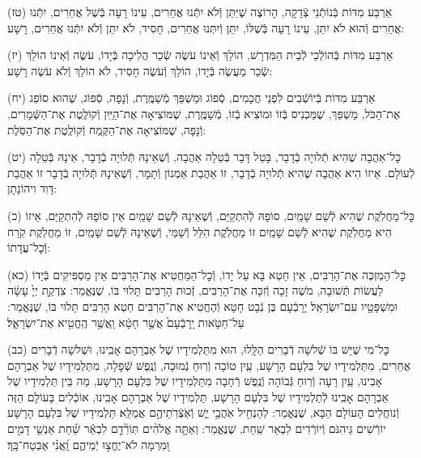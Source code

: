 \documentclass[twoside, openany, parskip=half, 11pt]{book}
\begin{document}
(טז)
אַרְבַּע מִדּוֹת בְּֿנוֹתְֿנֵי צְֿדָקָה, הָרוֹצֶה שֶׁיִּתֵּן וְֿלֹא יִתְּֿנוּ אֲחֵרִים, עֵינוֹ רָעָה בְּֿשֶׁל אֲחֵרִים, יִתְּֿנוּ אֲחֵרִים וְֿהוּא לֹא יִתֵּן, עֵינוֹ רָעָה בְּֿשֶׁלּוֹ, יִתֵּן וְֿיִתְּנוּ אֲחֵרִים, חָסִיד, לֹא יִתֵּן וְֿלֹא יִתְּֿנוּ אֲחֵרִים, רָשָׁע:

(יז)
אַרְבַּע מִדּוֹת בְּֿהוֹלְֿכֵי לְֿבֵית הַמִּדְרָשׁ, הוֹלֵךְ וְֿאֵינוֹ עֹשֶׂה שְֿׂכַר הֲלִיכָה בְּֿיָדוֹ, עֹשֶׂה וְֿאֵינוֹ הוֹלֵךְ שְֿׂכַר מַעֲשֶׂה בְּֿיָדוֹ, הוֹלֵךְ וְֿעֹשֶׂה חָסִיד, לֹא הוֹלֵךְ וְֿלֹא עֹשֶׂה רָשָׁע:

(יח)
אַרְבַּע מִדּוֹת בְּֿיוֹשְֿׁבִים לִפְנֵי חֲכָמִים, סְֿפוֹג וּמַשְׁפֵּךְ מְֿשַׁמֶּֽרֶת, וְֿנָפָה, סְֿפוֹג, שֶׁהוּא סוֹפֵג אֶת־הַכֹּל, מַשְׁפֵּךְ, שֶׁמַּכְנִיס בְּֿזוֹ וּמוֹצִיא בְֿזוֹ, מְֿשַׁמֶּֽרֶת, שֶׁמּוֹצִיאָה אֶת־הַיַּֽיִן וְֿקוֹלֶֽטֶת אֶת־הַשְּֿׁמָרִים, וְֿנָפָה, שֶׁמּוֹצִיאָה אֶת־הַקֶּֽמַח וְֿקוֹלֶֽטֶת אֶת־הַסֹּֽלֶת:

(יט)
כׇּל־אַהֲבָה שֶׁהִיא תְֿלוּיָה בְֿדָבָר, בָּטֵל דָּבָר בְּֿטֵלָה אַהֲבָה, וְֿשֶׁאֵינָהּ תְּֿלוּיָה בְֿדָבָר, אֵינָהּ בְּֿטֵלָה לְֿעוֹלָם. אֵיזוֹ הִיא אַהֲבָה שֶׁהִיא תְֿלוּיָה בְֿדָבָר, זוֹ אַהֲבַת אַמְנוֹן וְֿתָמָר, וְֿשֶׁאֵינָהּ תְּֿלוּיָה בְֿדָבָר זוֹ אַהֲבַת דָּוִד וִיהוֹנָתָן:


(כ)
כׇּל־מַחֲלֹֽקֶת שֶׁהִיא לְֿשֵׁם שָׁמַֽיִם, סוֹפָהּ לְֿהִתְקַיַּם, וְֿשֶׁאֵינָהּ לְֿשֵׁם שָׁמַֽיִם אֵין סוֹפָהּ לְֿהִתְקַיַּם, אֵיזוֹ הִיא מַחֲלֹֽקֶת שֶׁהִיא לְֿשֵׁם שָׁמַֽיִם זוֹ מַחֲלֹֽקֶת הִלֵּל וְֿשַׁמַּי, וְֿשֶׁאֵינָהּ לְֿשֵׁם שָׁמַֽיִם, זוֹ מַחֲלֹֽקֶת קֹֽרַח וְֿכׇל־עֲדָתוֹ:

(כא)
כׇּל־הַמְזְכֶּה אֶת־הָרַבִּים, אֵין חֵטְא בָּא עַל יָדוֹ, וְֿכׇל־הַמַּחֲטִיא אֶת־הָרַבִּים אֵין מַסְפִּיקִים בְּֿיָדוֹ לַעֲשׂוֹת תְּֿשׁוּבָה, מֹשֶׁה זָכָה וְֿזִכָּה אֶת־הָרַבִּים, זְֿכוּת הָרַבִּים תָּלוּי בּוֹ, שֶׁנֶּאֱמַר: צִדְקַ֤ת יְיָ֙ עָשָׂ֔ה וּמִשְׁפָּטָ֖יו עִם־יִשְׂרָאֵֽל׃ יָרָבְֿעָם בֶּן נְֿבָט חָטָא וְֿהֶחֱטִיא אֶת־הָרַבִּים חֵטְא הָרַבִּים תָּלוּי בּוֹ, שֶׁנֶּאֱמַר: עַל־חַטֹּ֤אות יָֽרָבְֿעָם֙ אֲשֶׁ֣ר חָטָ֔א וַֽאֲשֶׁ֥ר הֶֽחֱטִ֖יא אֶת־יִשְׂרָאֵ֑ל׃

(כב)
כׇּל־מִי שֶׁיֵּשׁ בּוֹ שְֿׁלשָׁה דְֿבָרִים הַלָּֽלוּ, הוּא מִתַּלְמִידָיו שֶׁל אַבְרָהָם אָבִֽינוּ, וּשְׁלשָׁה דְֿבָרִים אֲחֵרִים, מִתַּלְמִידָיו שֶׁל בִּלְעָם הָרָשָׁע, עַֽיִן טוֹבָה וְֿרֽוּחַ נְֿמוּכָה, וְֿנֶֽפֶשׁ שְֿׁפָלָה, מִתַּלְמִידָיו שֶׁל אַבְרָהָם אָבִינוּ, עַֽיִן רָעָה וְֿרֽוּחַ גְּֿבוֹהָה וְֿנֶֽפֶשׁ רְֿחָבָה מִתַּלְמִידָיו שֶׁל בִּלְעָם הָרָשָׁע, מַה בֵּין תַּלְמִידָיו שֶׁל אַבְרָהָם אָבִֽינוּ לְֿתַלְמִידָיו שֶׁל בִּלְעָם הָרָשָׁע, תַּלְמִידָיו שֶׁל אַבְרָהָם אָבִֽינוּ, אוֹכְֿלִים בָּעוֹלָם הַזֶּה וְֿנוֹחֲלִים הָעוֹלָם הַבָּא, שֶׁנֶּאֱמַר: לְהַנְחִ֖יל אֹֽהֲבַ֥י יֵ֑שׁ וְֿאֹֽצְֿרֹֽתֵיהֶ֣ם אֲמַלֵּֽא׃ תַּלְמִידָיו שֶׁל בִּלְעָם הָרָשָׁע יוֹרְֿשִׁים גֵּיהִנֹּם וְֿיוֹרְֿדִים לִבְאֵר שַֽׁחַת, שֶׁנֶּאֱמַר: וְאַתָּ֤ה אֱלֹהִ֨ים תּֽוֹרִ֘דֵ֤ם לִבְאֵ֬ר שַׁ֗חַת אַנְשֵׁ֤י דָמִ֣ים וּ֭מִרְמָה לֹא־יֶחֱצ֣וּ יְֿמֵיהֶ֑ם וַֽ֝אֲנִ֗י אֶבְטַח־בָּֽךְ׃
\end{document}
